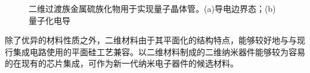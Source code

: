     \begin{figure}[htb]
        \caption{
            二维过渡族金属硫族化物用于实现量子晶体管。(a)导电边界态；(b)量子化电导
        }
        \label{fig:intro_TMDS-quantumTran}
    \end{figure}

    除了优异的材料性质之外，二维材料由于其平面化的结构特点，能够较好地与与现行集成电路使用的平面硅工艺兼容。以二维材料制成的二维纳米器件能够较为容易的在现有的芯片集成，可作为新一代纳米电子器件的候选材料。

